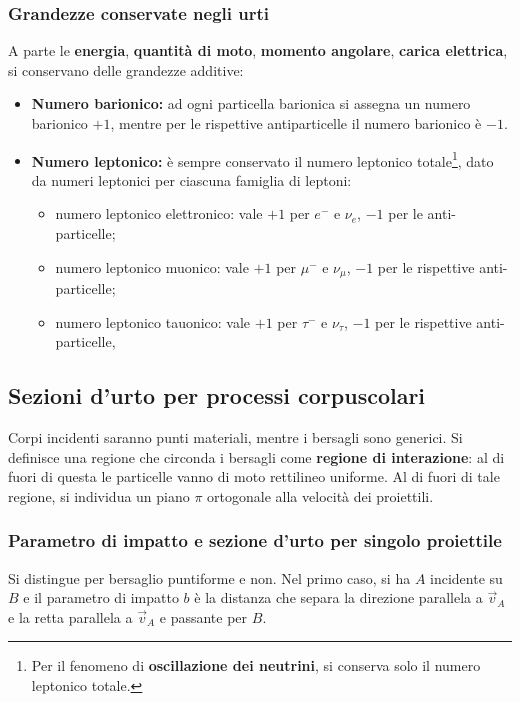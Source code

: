 \documentclass[10pt, a4paper]{scrartcl}
\numberwithin{equation}{subsection}
\theoremstyle{style1}
\begin{document}
\subsubsection{Grandezze conservate negli urti}
A parte le \textbf{energia}, \textbf{quantit\`a di moto}, \textbf{momento angolare}, \textbf{carica elettrica}, si conservano delle grandezze additive:
\begin{itemize}
       \item \textbf{Numero barionico:} ad ogni particella barionica si assegna un numero barionico $+1$, mentre per le rispettive antiparticelle il numero barionico è $-1$.

       \item \textbf{Numero leptonico:} \`e sempre conservato il numero leptonico totale\footnote{Per il fenomeno di \textbf{oscillazione dei neutrini}, si conserva solo il numero leptonico totale.}, dato da  numeri leptonici per ciascuna famiglia di leptoni:
	       \begin{itemize}
        \item numero leptonico elettronico: vale $+1$ per $e^-$ e $\nu_e$, $-1$ per le anti-particelle;
	\item numero leptonico muonico: vale $+1$ per $\mu^-$ e $\nu_\mu$, $-1$ per le rispettive anti-particelle;
	\item numero leptonico tauonico: vale $+1$ per $\tau^-$ e $\nu_\tau$, $-1$ per le rispettive anti-particelle,
\end{itemize}
\end{itemize}





\subsection{Sezioni d'urto per processi corpuscolari}

Corpi incidenti saranno punti materiali, mentre i bersagli sono generici. Si definisce una regione che circonda i bersagli come \textbf{regione di interazione}: al di fuori di questa le particelle vanno di moto rettilineo uniforme. Al di fuori di tale regione, si individua un piano $\pi$ ortogonale alla velocit\`a dei proiettili. 
\subsubsection{Parametro di impatto e sezione d'urto per singolo proiettile}

Si distingue per bersaglio puntiforme e non. Nel primo caso, si ha $A$ incidente su $B$ e il parametro di impatto $b$ \`e la distanza che separa la direzione parallela a $\vec{v}_A$ e la retta parallela a $\vec{v}_A$ e passante per $B$. 
\end{document}
